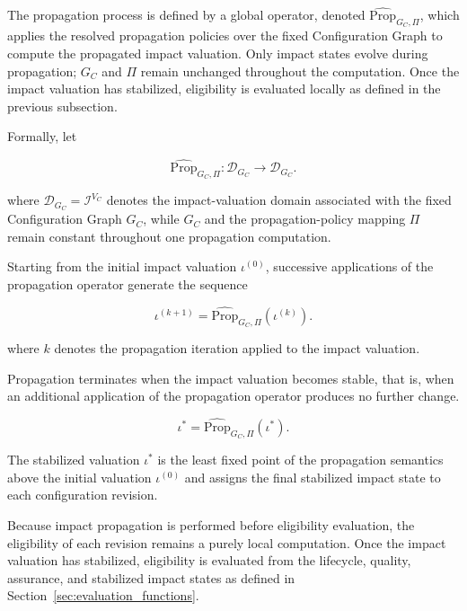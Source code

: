 \documentclass[10pt]{article}
\begin{document}
The propagation process is defined by a global operator, denoted
$\widehat{\mathrm{Prop}}_{G_C,\Pi}$, which applies the resolved propagation policies over the fixed Configuration Graph to compute the propagated impact valuation. Only impact states evolve during propagation; $G_C$ and $\Pi$ remain unchanged throughout the computation. Once the impact valuation has stabilized, eligibility is evaluated locally as defined in the previous subsection.

Formally, let

\begin{equation}
	\label{eq:prop_operator}
	\widehat{\mathrm{Prop}}_{G_C,\Pi}
	:
	\mathcal{D}_{G_C}
	\rightarrow
	\mathcal{D}_{G_C}.
\end{equation}

where $\mathcal{D}_{G_C}=\mathcal{I}^{V_C}$ denotes the impact-valuation domain associated with the fixed Configuration Graph $G_C$, while $G_C$ and the propagation-policy mapping $\Pi$ remain constant throughout one propagation computation.

Starting from the initial impact valuation $\iota^{(0)}$, successive
applications of the propagation operator generate the sequence

\begin{equation}
	\label{eq:prop_iteration}
	\iota^{(k+1)}
	=
	\widehat{\mathrm{Prop}}_{G_C,\Pi}
	\!\left(
	\iota^{(k)}
	\right).
\end{equation}

where $k$ denotes the propagation iteration applied to the impact valuation.

Propagation terminates when the impact valuation becomes stable, that is, when an additional application of the propagation operator produces no further change.

\begin{equation}
	\label{eq:fixed_point}
	\iota^{*}
	=
	\widehat{\mathrm{Prop}}_{G_C,\Pi}
	\!\left(
	\iota^{*}
	\right).
\end{equation}

The stabilized valuation $\iota^{*}$ is the least fixed point of the
propagation semantics above the initial valuation $\iota^{(0)}$ and assigns the
final stabilized impact state to each configuration revision.

Because impact propagation is performed before eligibility evaluation, the eligibility of each revision remains a purely local computation. Once the impact valuation has stabilized, eligibility is evaluated from the lifecycle, quality, assurance, and stabilized impact states as defined in Section~\ref{sec:evaluation_functions}.
\end{document}
